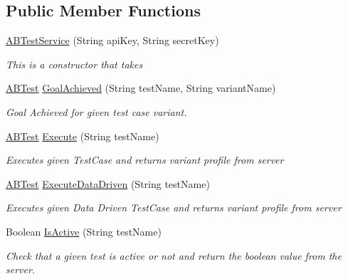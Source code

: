 \subsection*{Public Member Functions}
\begin{DoxyCompactItemize}
\item 
\hyperlink{classcom_1_1shephertz_1_1app42_1_1paas_1_1sdk_1_1csharp_1_1ab_test_1_1_a_b_test_service_a0e66bd8004f93f004171e25097e4d2d6}{A\+B\+Test\+Service} (String api\+Key, String secret\+Key)
\begin{DoxyCompactList}\small\item\em This is a constructor that takes \end{DoxyCompactList}\item 
\hyperlink{classcom_1_1shephertz_1_1app42_1_1paas_1_1sdk_1_1csharp_1_1ab_test_1_1_a_b_test}{A\+B\+Test} \hyperlink{classcom_1_1shephertz_1_1app42_1_1paas_1_1sdk_1_1csharp_1_1ab_test_1_1_a_b_test_service_acab0f2a6f9fa55df32437f0bc0eec12c}{Goal\+Achieved} (String test\+Name, String variant\+Name)
\begin{DoxyCompactList}\small\item\em Goal Achieved for given test case variant. \end{DoxyCompactList}\item 
\hyperlink{classcom_1_1shephertz_1_1app42_1_1paas_1_1sdk_1_1csharp_1_1ab_test_1_1_a_b_test}{A\+B\+Test} \hyperlink{classcom_1_1shephertz_1_1app42_1_1paas_1_1sdk_1_1csharp_1_1ab_test_1_1_a_b_test_service_a3d7da96d74de3f1bf0b9d8151a8c9b14}{Execute} (String test\+Name)
\begin{DoxyCompactList}\small\item\em Executes given Test\+Case and returns variant profile from server \end{DoxyCompactList}\item 
\hyperlink{classcom_1_1shephertz_1_1app42_1_1paas_1_1sdk_1_1csharp_1_1ab_test_1_1_a_b_test}{A\+B\+Test} \hyperlink{classcom_1_1shephertz_1_1app42_1_1paas_1_1sdk_1_1csharp_1_1ab_test_1_1_a_b_test_service_a5bf748d45ed1bc7d044fda1c3d1f5218}{Execute\+Data\+Driven} (String test\+Name)
\begin{DoxyCompactList}\small\item\em Executes given Data Driven Test\+Case and returns variant profile from server \end{DoxyCompactList}\item 
Boolean \hyperlink{classcom_1_1shephertz_1_1app42_1_1paas_1_1sdk_1_1csharp_1_1ab_test_1_1_a_b_test_service_a62bd3dc4a4304a70d9983d4d2073313b}{Is\+Active} (String test\+Name)
\begin{DoxyCompactList}\small\item\em Check that a given test is active or not and return the boolean value from the server. \end{DoxyCompactList}\end{DoxyCompactItemize}
